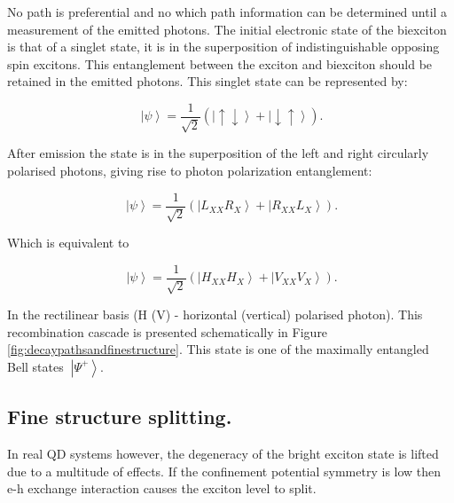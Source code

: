 \documentclass[12pt, twoside]{article}
\numberwithin{equation}{section}
\begin{document}
No path is preferential and no which path information can be determined
until a measurement of the emitted photons. The initial electronic state
of the biexciton is that of a singlet state, it is in the superposition
of indistinguishable opposing spin excitons. This entanglement between
the exciton and biexciton should be retained in the emitted photons.
This singlet state can be represented by:

\begin{equation}
\ \left|\psi\right\rangle = \frac{1}{\sqrt{2}} \left(\left|\uparrow\downarrow\right\rangle + \left|\downarrow\uparrow\right\rangle \right).
\end{equation}

After emission the state is in the superposition of the left and right
circularly polarised photons, giving rise to photon polarization
entanglement:

\begin{equation}
\ \left|\psi\right\rangle = \frac{1}{\sqrt{2}} \left(\left|L_{XX} R_X\right\rangle + \left|R_{XX} L_X\right\rangle \right).
\end{equation}

Which is equivalent to

\begin{equation}
\ \left|\psi\right\rangle = \frac{1}{\sqrt{2}} 
\left(\left|H_{XX} H_X\right\rangle + \left|V_{XX} V_X\right\rangle \right).
\end{equation}

In the rectilinear basis (H (V) - horizontal (vertical) polarised
photon). This recombination cascade is presented schematically in Figure
\ref{fig:decaypathsandfinestructure}. This state is one of the maximally
entangled Bell states $\ \left|\Psi^{+}\right\rangle$.

\subsection{Fine structure splitting.}\label{fine-structure-splitting.}

In real QD systems however, the degeneracy of the bright exciton state
is lifted due to a multitude of effects. If the confinement potential
symmetry is low then e-h exchange interaction causes the exciton level
to split.
\end{document}
